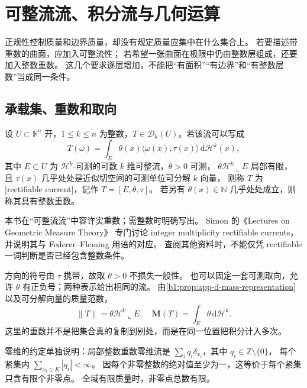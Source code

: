 \section{可整流流、积分流与几何运算}
\label{b1:sec:D103}

正规性控制质量和边界质量，却没有规定质量应集中在什么集合上。
若要描述带重数的曲面，应加入可整流性；
若希望一张曲面在极限中仍由整数层组成，还要加入整数重数。
这几个要求逐层增加，不能把“有面积”“有边界”和“有整数层数”当成同一条件。

\subsection{承载集、重数和取向}
\label{b1:subsec:D10301}

\begin{definition}\label{b1:def:app-d-rectifiable-current}
设 \(U\subset\mathbb R^n\) 开，\(1\le k\le n\) 为整数，\(T\in\mathcal D_k(U)\)。若该流可以写成
\[
 T(\omega)=\int_E\theta(x)
                 \langle\omega(x),\tau(x)\rangle\,\mathrm{d}\mathcal H^k(x),
\]
其中 \(E\subset U\) 为 \(\mathcal H^k\)-可测的可数 \(k\) 维可整流，\(\theta>0\) 可测，
\(\theta\mathcal H^k\llcorner E\) 局部有限，
且 \(\tau(x)\) 几乎处处是近似切空间的可测单位可分解 \(k\) 向量，
则称 \(T\) 为%
[rectifiable current]，记作 \(T=[E,\theta,\tau]\)。
若另有 \(\theta(x)\in\mathbb N\) 几乎处处成立，则称其具有整数重数。
\end{definition}

本书在“可整流流”中容许实重数；需整数时明确写出。
Simon 的《Lectures on Geometric Measure Theory》%
\cite[\S27]{Simon1983Lectures}专门讨论 integer multiplicity rectifiable currents，
并说明其与 Federer--Fleming 用语的对应。
查阅其他资料时，不能仅凭 rectifiable 一词判断是否已经包含整数条件。

\ProseParagraphBreak

方向的符号由 \(\tau\) 携带，故取 \(\theta>0\) 不损失一般性。
也可以固定一套可测取向，允许 \(\theta\) 有正负号；两种表示给出相同的流。
由\cref{b1:prop:app-d-mass-representation}以及可分解向量的质量范数，
\[
 \|T\|=\theta\mathcal H^k\llcorner E,\quad
 \mathbf M(T)=\int_E\theta\,\mathrm{d}\mathcal H^k.
\]
这里的重数并不是把集合真的复制到别处，而是在同一位置把积分计入多次。

\ProseParagraphBreak

零维的约定单独说明：局部整数重数零维流是
\(\sum_iq_i\delta_{x_i}\)，其中 \(q_i\in\mathbb Z\setminus\{0\}\)，
每个紧集内 \(\sum_{x_i\in K}|q_i|<\infty\)。
因每个非零整数的绝对值至少为一，这等价于每个紧集只含有限个非零点。
全域有限质量时，非零点总数有限。

